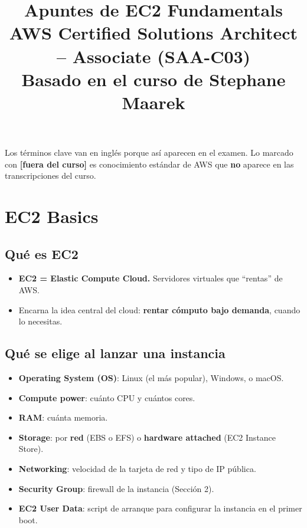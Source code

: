 \documentclass[11pt,a4paper]{article}
\title{%
  {\Huge\bfseries\color{awsdark}Apuntes de EC2 Fundamentals}\\[0.4em]
  {\Large\color{awsorange}AWS Certified Solutions Architect -- Associate (SAA-C03)}\\[0.4em]
  {\normalsize\color{gray}Basado en el curso de Stephane Maarek}%
}
\author{}
\date{}
\let\oldsection\section
\renewcommand{\section}{\Needspace{9\baselineskip}\oldsection}
\let\oldsubsection\subsection
\renewcommand{\subsection}{\Needspace{6\baselineskip}\oldsubsection}
\newcommand{\fc}{{\small\textcolor{awsorange}{\textbf{[fuera del curso]}}}}
\begin{document}
\maketitle
\thispagestyle{fancy}

\begin{nota}[title=Cómo leer estos apuntes]
Los términos clave van en inglés porque así aparecen en el examen. Lo marcado con \fc{} es conocimiento estándar de AWS que \textbf{no} aparece en las transcripciones del curso.
\end{nota}

\tableofcontents
\newpage

\section{EC2 Basics}

\subsection{Qué es EC2}
\begin{itemize}
  \item \textbf{EC2 = Elastic Compute Cloud.} Servidores virtuales que ``rentas'' de AWS.
  \item Encarna la idea central del cloud: \textbf{rentar cómputo bajo demanda}, cuando lo necesitas.
\end{itemize}

\subsection{Qué se elige al lanzar una instancia}
\begin{itemize}
  \item \textbf{Operating System (OS)}: Linux (el más popular), Windows, o macOS.
  \item \textbf{Compute power}: cuánto CPU y cuántos cores.
  \item \textbf{RAM}: cuánta memoria.
  \item \textbf{Storage}: por \textbf{red} (EBS o EFS) o \textbf{hardware attached} (EC2 Instance Store).
  \item \textbf{Networking}: velocidad de la tarjeta de red y tipo de IP pública.
  \item \textbf{Security Group}: firewall de la instancia (Sección 2).
  \item \textbf{EC2 User Data}: script de arranque para configurar la instancia en el primer boot.
\end{itemize}
\end{document}
